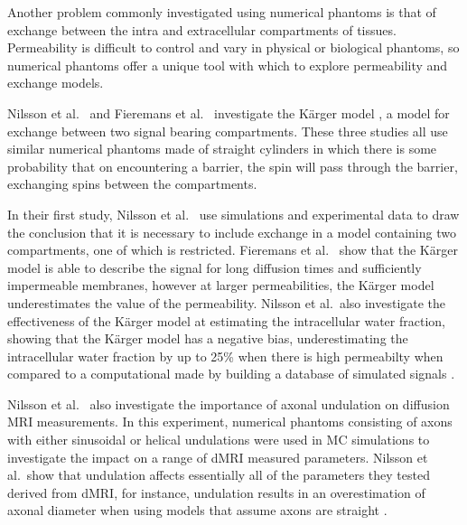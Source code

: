 
Another problem commonly investigated using numerical phantoms is that of exchange between the intra and extracellular compartments of tissues.
Permeability is difficult to control and vary in physical or biological phantoms, so numerical phantoms offer a unique tool with which to explore permeability and exchange models.

Nilsson et al.\ \cite{Nilsson2009, Nilsson2010} and Fieremans et al.\ \cite{Fieremans2010} investigate the K\"arger model \cite{KARGER1988}, a model for exchange between two signal bearing compartments.
These three studies all use similar numerical phantoms made of straight cylinders in which there is some probability that on encountering a barrier, the spin will pass through the barrier, exchanging spins between the compartments.

In their first study, Nilsson et al.\ \cite{Nilsson2009} use simulations and experimental data to draw the conclusion that it is necessary to include exchange in a model containing two compartments, one of which is restricted. 
Fieremans et al.\ \cite{Fieremans2010} show that the K\"arger model is able to describe the signal for long diffusion times and sufficiently impermeable membranes, however at larger permeabilities, the K\"arger model underestimates the value of the permeability.
Nilsson et al.\ also investigate the effectiveness of the K\"arger model at estimating the intracellular water fraction, showing that the K\"arger model has a negative bias, underestimating the intracellular water fraction by up to 25\% when there is high permeabilty when compared to a computational made by building a database of simulated signals \cite{Nilsson2010}.

Nilsson et al.\ \cite{Nilsson2012} also investigate the importance of axonal undulation on diffusion MRI measurements.
In this experiment, numerical phantoms consisting of axons with either sinusoidal or helical undulations were used in \ac{MC} simulations to investigate the impact on a range of \ac{dMRI} measured parameters.
Nilsson et al.\ show that undulation affects essentially all of the parameters they tested derived from \ac{dMRI}, for instance, undulation results in an overestimation of axonal diameter when using models that assume axons are straight \cite{Nilsson2012}. 

